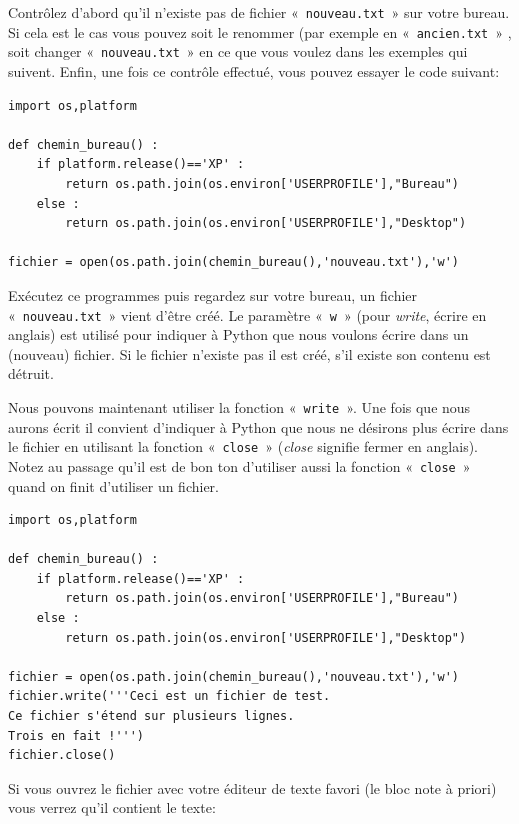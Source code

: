 Contrôlez d'abord qu'il n'existe pas de fichier « \texttt{nouveau.txt} » sur votre bureau. Si cela est le cas vous pouvez soit le renommer (par exemple en « \texttt{ancien.txt} » , soit changer « \texttt{nouveau.txt} » en ce que vous voulez dans les exemples qui suivent. Enfin, une fois ce contrôle effectué, vous pouvez essayer le code suivant:

\begin{Verbatim}[frame=single,rulecolor=\color{mbleu}, label=à taper par exemple en reprenant l'existant]
import os,platform

def chemin_bureau() :
    if platform.release()=='XP' :
        return os.path.join(os.environ['USERPROFILE'],"Bureau")
    else :
        return os.path.join(os.environ['USERPROFILE'],"Desktop")
    
fichier = open(os.path.join(chemin_bureau(),'nouveau.txt'),'w')
\end{Verbatim}

Exécutez ce programmes puis regardez sur votre bureau, un fichier « \texttt{nouveau.txt} » vient d'être créé. Le paramètre « \texttt{w} » (pour \emph{write}, écrire en anglais) est utilisé pour indiquer à Python que nous voulons écrire dans un (nouveau) fichier. Si le fichier n'existe pas il est créé, s'il existe son contenu est détruit.

Nous pouvons maintenant utiliser la fonction « \texttt{write} ». Une fois que nous aurons écrit il convient d'indiquer à Python que nous ne désirons plus écrire dans le fichier en utilisant la fonction « \texttt{close} » (\emph{close} signifie fermer en anglais). Notez au passage qu'il est de bon ton d'utiliser aussi la fonction « \texttt{close} » quand on finit d'utiliser un fichier.
 
\begin{Verbatim}[frame=single,rulecolor=\color{mbleu}, label=à taper par exemple en reprenant l'existant]
import os,platform

def chemin_bureau() :
    if platform.release()=='XP' :
        return os.path.join(os.environ['USERPROFILE'],"Bureau")
    else :
        return os.path.join(os.environ['USERPROFILE'],"Desktop")
    
fichier = open(os.path.join(chemin_bureau(),'nouveau.txt'),'w')
fichier.write('''Ceci est un fichier de test.
Ce fichier s'étend sur plusieurs lignes.
Trois en fait !''')
fichier.close()
\end{Verbatim}

Si vous ouvrez le fichier avec votre éditeur de texte favori (le bloc note à priori) vous verrez qu'il contient le texte:

